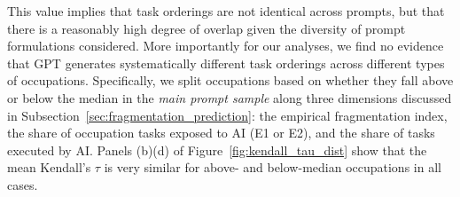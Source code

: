 This value implies that task orderings are not identical across prompts, but that there is a reasonably high degree of overlap given the diversity of prompt formulations considered.
More importantly for our analyses, we find no evidence that GPT generates systematically different task orderings across different types of occupations.
Specifically, we split occupations based on whether they fall above or below the median in the \emph{main prompt sample} along three dimensions discussed in Subsection~\ref{sec:fragmentation_prediction}: the empirical fragmentation index, the share of occupation tasks exposed to AI (E1 or E2), and the share of tasks executed by AI.
Panels (b)\textendash(d) of Figure~\ref{fig:kendall_tau_dist} show that the mean Kendall's $\tau$ is very similar for above- and below-median occupations in all cases.

